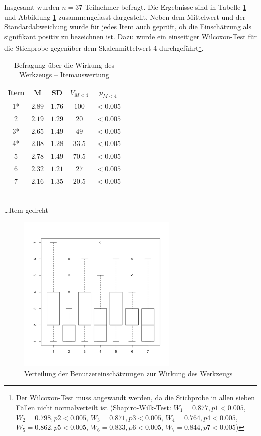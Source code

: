 Insgesamt wurden $n=37$ Teilnehmer befragt. Die Ergebnisse sind in Tabelle \ref{tab:behinderung} und Abbildung \ref{fig:img_Evaluierung_behinderung} zusammengefasst dargestellt. Neben dem Mittelwert und der Standardabweichung wurde für jedes Item auch geprüft, ob die Einschätzung als signifikant positiv zu bezeichnen ist. Dazu wurde ein einseitiger Wilcoxon-Test für die Stichprobe gegenüber dem Skalenmittelwert 4 durchgeführt\footnote{Der Wilcoxon-Test muss angewandt werden, da die Stichprobe in allen sieben Fällen nicht normalverteilt ist (Shapiro-Wilk-Test: $W_{1}=0.877, p{1}<0.005$, $W_{2}=0.798, p{2}<0.005$, $W_{3}=0.871, p{3}<0.005$, $W_{4}=0.764, p{4}<0.005$, $W_{5}=0.862, p{5}<0.005$, $W_{6}=0.833, p{6}<0.005$, $W_{7}=0.844, p{7}<0.005$)}.

\begin{table}[htbp]
	\centering
	\caption{Befragung über die Wirkung des Werkzeugs -- Itemauswertung}

\begin{tabular}{| c || c | c || c | c |}
  \hline
   Item & M & SD & $V_{M<4}$ & $p_{M<4}$ \\ \hline
   1* & $2.89$ & $1.76$ & $100$ & $<0.005$ \\ 
   2  & $2.19$ & $1.29$ & $20$ & $<0.005$ \\ 
   3* & $2.65$ & $1.49$ & $49$ & $<0.005$ \\ 
   4* & $2.08$ & $1.28$ & $33.5$ & $<0.005$ \\ 
   5  & $2.78$ & $1.49$ & $70.5$ & $<0.005$ \\ 
   6  & $2.32$ & $1.21$ & $27$ & $<0.005$ \\ 
   7  & $2.16$ & $1.35$ & $20.5$ & $<0.005$ \\ \hline
\end{tabular} \\ 
	\footnotesize * \ldots Item gedreht
	\label{tab:behinderung}
\end{table}

\begin{figure}[htbp]
	\centering
		\includegraphics[height=3in]{img/Evaluierung/behinderung.png}
	\caption{Verteilung der Benutzereinschätzungen zur Wirkung des Werkzeugs}
	\label{fig:img_Evaluierung_behinderung}
\end{figure}

